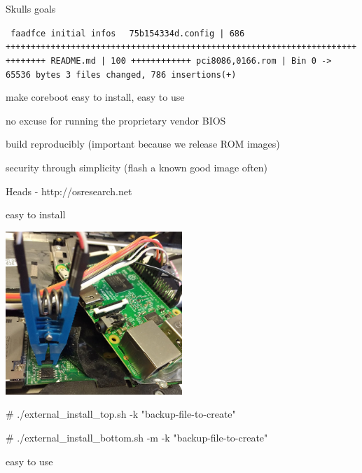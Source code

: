 \documentclass[14pt]{beamer}
\begin{document}
\begin{frame}
Skulls goals
\end{frame}


\begin{frame}
\texttt{
faadfce initial infos
}
\texttt{
 75b154334d.config | 686 ++++++++++++++++++++++++++++++++++++++++++++++++++++++++++++++++++++++++++++++
 README.md         | 100 ++++++++++++
 pci8086,0166.rom  | Bin 0 -> 65536 bytes
 3 files changed, 786 insertions(+)
}
\end{frame}


\begin{frame}
make coreboot easy to install, easy to use

no excuse for running the proprietary vendor BIOS
\pause

build reproducibly (important because we release ROM images)

security through simplicity (flash a known good image often)

Heads - http://osresearch.net
\end{frame}


\begin{frame}
easy to install
\end{frame}


\begin{frame}
\includegraphics[width=0.5\textwidth]{rpi_clip.jpg}

\# ./external\_install\_top.sh -k "backup-file-to-create"

\# ./external\_install\_bottom.sh -m -k "backup-file-to-create"
\end{frame}


\begin{frame}
easy to use
\end{frame}
\end{document}
